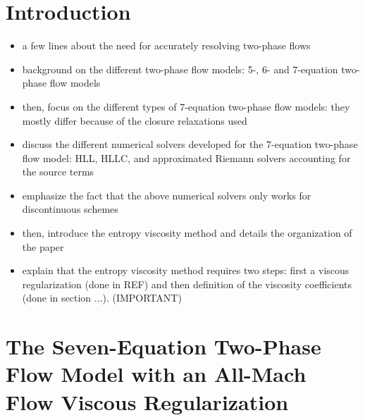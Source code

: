 \documentclass[preprint,10pt]{elsarticle}
\begin{document}
\section{Introduction}\label{sec:intro}

\begin{itemize}
\item a few lines about the need for accurately resolving two-phase flows 
\item background on the different two-phase flow models: 5-, 6- and 7-equation two-phase flow models 
\item then, focus on the different types of 7-equation two-phase flow models: they mostly differ because of the closure relaxations used
\item discuss the different numerical solvers developed for the 7-equation two-phase flow model: HLL, HLLC, and approximated Riemann solvers accounting 
for the source terms
\item emphasize the fact that the above numerical solvers only works for discontinuous schemes
\item then, introduce the entropy viscosity method and details the organization of the paper 
\item explain that the entropy viscosity method requires two steps: first a viscous regularization (done in REF) and then definition of the viscosity coefficients 
(done in section ...). (IMPORTANT)
\end{itemize}

\section{The Seven-Equation Two-Phase Flow Model with an All-Mach Flow Viscous Regularization}\label{sec:7-equ-model}
\end{document}
